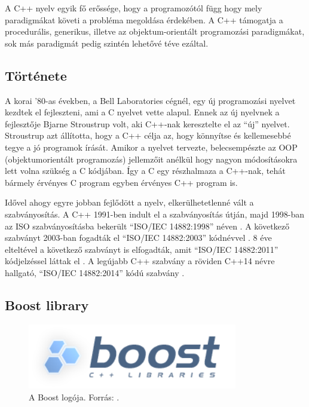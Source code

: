 \documentclass[a4paper,12pt]{report}
\begin{document}
A C++ nyelv egyik fő erőssége, hogy a programozótól függ hogy mely paradigmákat követi a probléma megoldása érdekében. A C++ támogatja a procedurális, generikus, illetve az objektum-orientált programozási paradigmákat, sok más paradigmát pedig szintén lehetővé téve ezáltal.



\subsection{Története}
\label{cpphistory}

A korai '80-as években, a Bell Laboratories cégnél, egy új programozási nyelvet kezdtek el fejleszteni, ami a C nyelvet vette alapul. Ennek az új nyelvnek a fejlesztője Bjarne Stroustrup volt, aki C++-nak keresztelte el az ``új'' nyelvet. Stroustrup azt állította, hogy a C++ célja az, hogy könnyítse és kellemesebbé tegye a jó programok írását. Amikor a nyelvet tervezte, belecsempészte az OOP (objektumorientált programozás) jellemzőit anélkül hogy nagyon módosításokra lett volna szükség a C kódjában. Így a C egy részhalmaza a C++-nak, tehát bármely érvényes C program egyben érvényes C++ program is.

\vspace{2mm}
Idővel ahogy egyre jobban fejlődött a nyelv, elkerülhetetlenné vált a szabványosítás. A C++ 1991-ben indult el a szabványosítás útján, majd 1998-ban az ISO szabványosításba bekerült ``ISO/IEC 14882:1998'' néven \cite{c++98}. A következő szabványt 2003-ban fogadták el ``ISO/IEC 14882:2003'' kódnévvel \cite{c++03}. 8 éve elteltével a következő szabványt is elfogadták, amit ``ISO/IEC 14882:2011'' kódjelzéssel láttak el \cite{c++11}. A legújabb C++ szabvány a röviden C++14 névre hallgató, ``ISO/IEC 14882:2014'' kódú szabvány \cite{c++14}.

\subsection{Boost library}
\label{boost}

\begin{figure}[ht]
\centerline{
\includegraphics[width=3.6in]{img/boost}}
\caption{A Boost logója. Forrás: \cite{boostlogo}.}
\label{boostlogo}
\end{figure}
\end{document}
